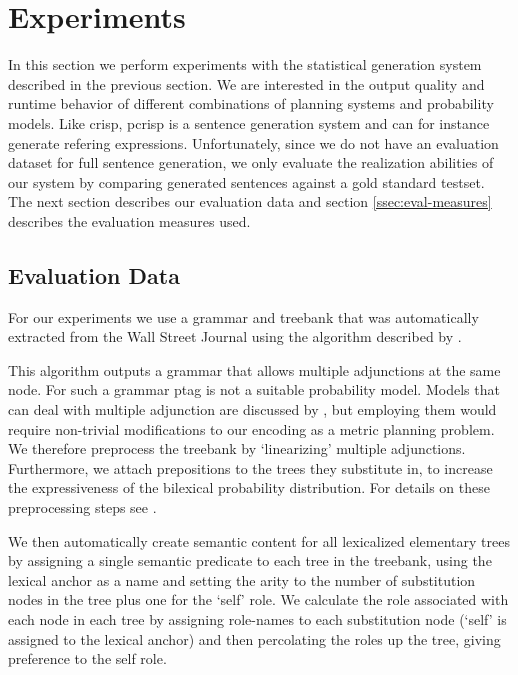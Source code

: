 \section{Experiments}
\label{sec:experiments}
In this section we perform experiments with the statistical generation system described in the previous section.  We are interested in the output quality and runtime behavior of different combinations of planning systems and probability models. Like {\sc crisp}, {\sc pcrisp} is a sentence generation system and can for instance generate refering expressions. Unfortunately, since we do not have an evaluation dataset for full sentence generation, we only evaluate the realization abilities of our system by comparing generated sentences against a gold standard testset. The next section describes our evaluation data and section \ref{ssec:eval-measures} describes the evaluation measures used. 

\subsection{Evaluation Data}

For our experiments we use a grammar and treebank that was automatically extracted from the Wall Street Journal using the algorithm described by .   

This algorithm outputs a grammar that allows multiple adjunctions at the same node. For such a grammar {\sc ptag} is not a suitable probability model. Models that can deal with multiple adjunction are discussed by , but employing them would require non-trivial modifications to our encoding as a metric planning problem. We therefore preprocess the treebank by `linearizing' multiple adjunctions. Furthermore, we attach prepositions to the trees they substitute in, to increase the expressiveness of the bilexical probability distribution. For details on these preprocessing steps see \cite{bauer2009}.


We then automatically create semantic content for all lexicalized elementary trees by assigning a single semantic predicate to each tree in the treebank, using the lexical anchor as a name and setting the arity to the number of substitution nodes in the tree plus one for the `self' role.  We calculate the role associated with each node in each tree by assigning role-names to each substitution node (`self' is assigned to the lexical anchor) and then percolating the roles up the tree, giving preference to the self role.  


